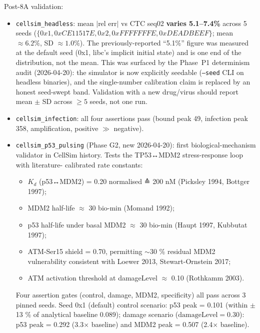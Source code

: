 \documentclass[11pt,letterpaper,twoside,openany]{book}
\newcommand{\code}[1]{\texttt{#1}}
\begin{document}
Post-8A validation:
\begin{itemize}
  \item \code{cellsim\_headless}: mean $|\text{rel err}|$ vs CTC
        seq02 \textbf{varies 5.1--7.4\%} across 5 seeds
        ($\{0x1, 0xCE11517E, 0x2, 0xFFFFFFFE, 0xDEADBEEF\}$;
        mean $\approx 6.2\%$, SD $\approx 1.0\%$).
        The previously-reported ``5.1\%'' figure was measured at
        the default seed (0x1, libc's implicit initial state) and is
        one end of the distribution, not the mean.
        This was surfaced by the Phase~P1 determinism audit
        (2026-04-20): the simulator is now explicitly seedable
        (\code{--seed} CLI on headless binaries), and the
        single-number calibration claim is replaced by an honest
        seed-swept band. Validation with a new drug/virus should
        report mean $\pm$ SD across $\geq 5$ seeds, not one run.
  \item \code{cellsim\_infection}: all four assertions pass (bound
        peak 49, infection peak 358, amplification, positive
        $\gg$ negative).
  \item \code{cellsim\_p53\_pulsing} (Phase G2, new 2026-04-20):
        first biological-mechanism validator in CellSim history.
        Tests the TP53↔MDM2 stress-response loop with literature-
        calibrated rate constants:
        \begin{itemize}
          \item $K_d$ (p53↔MDM2) = 0.20 normalised ≙ 200 nM
                (Picksley 1994, Bottger 1997);
          \item MDM2 half-life $\approx$ 30 bio-min (Momand 1992);
          \item p53 half-life under basal MDM2 $\approx$ 30 bio-min
                (Haupt 1997, Kubbutat 1997);
          \item ATM-Ser15 shield = 0.70, permitting $\sim$30 \%
                residual MDM2 vulnerability consistent with
                Loewer 2013, Stewart-Ornstein 2017;
          \item ATM activation threshold at damageLevel $\approx$ 0.10
                (Rothkamm 2003).
        \end{itemize}
        Four assertion gates (control, damage, MDM2, specificity)
        all pass across 3 pinned seeds.
        Seed 0x1 (default) control scenario: p53 peak = 0.101
        (within $\pm$13 \% of analytical baseline 0.089);
        damage scenario ($\text{damageLevel}=0.30$): p53 peak = 0.292
        (3.3× baseline) and MDM2 peak = 0.507 (2.4× baseline).

\end{itemize}
\end{document}
